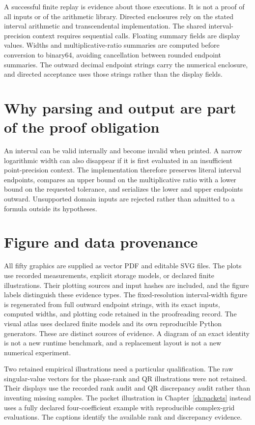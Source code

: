 

A successful finite replay is evidence about those executions. It is not a
proof of all inputs or of the arithmetic library. Directed enclosures rely on
the stated interval arithmetic and transcendental implementation. The shared
interval-precision context requires sequential calls. Floating summary fields
are display values. Widths and multiplicative-ratio summaries are computed
before conversion to binary64, avoiding cancellation between rounded endpoint
summaries. The outward decimal endpoint strings carry the numerical enclosure,
and directed acceptance uses those strings rather than the display fields.

\section{Why parsing and output are part of the proof obligation}
An interval can be valid internally and become invalid when printed. A narrow
logarithmic width can also disappear if it is first evaluated in an
insufficient point-precision context. The implementation therefore preserves
literal interval endpoints, compares an upper bound on the multiplicative
ratio with a lower bound on the requested tolerance, and serializes the lower
and upper endpoints outward. Unsupported domain inputs are rejected rather
than admitted to a formula outside its hypotheses.

\section{Figure and data provenance}\label{app:provenance}
All fifty graphics are supplied as vector PDF and editable SVG files. The
plots use recorded measurements, explicit storage models, or declared finite
illustrations. Their plotting sources and input hashes are included, and
the figure labels distinguish these evidence types. The fixed-resolution
interval-width figure is regenerated from full outward endpoint strings,
with its exact inputs, computed widths, and plotting code retained in the
proofreading record. The visual atlas
uses declared finite models and its own reproducible Python generators.
These are distinct sources of evidence. A diagram of an exact identity is
not a new runtime benchmark, and a replacement layout is not a new numerical
experiment.

Two retained empirical illustrations need a particular qualification. The raw
singular-value vectors for the phase-rank and QR illustrations were not retained. Their
displays use the recorded rank audit and QR discrepancy audit rather than inventing
missing samples. The packet illustration in Chapter~\ref{ch:packets} instead uses a
fully declared four-coefficient example with reproducible complex-grid evaluations.
The captions identify the available rank and discrepancy evidence.

